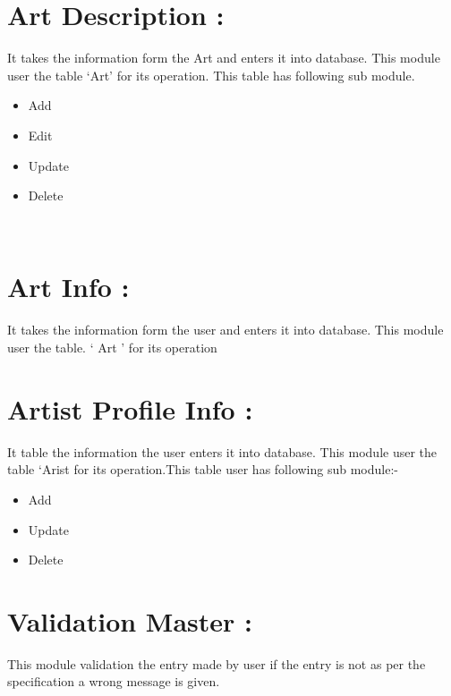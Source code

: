 \documentclass{article}
\begin{document}
\section*{Art Description : }
It takes the information form the Art and enters it into database. This module user the table ‘Art’ for its operation.
This table has following sub module.
\begin{itemize}
    \item Add
\item Edit
\item Update
\item Delete
\end{itemize}
\\
\section*{Art Info : }
It takes the information form the user and enters it into database. This module user the table. ‘ Art ’ for its operation
\section*{Artist Profile Info : }
It table the information the user enters it into database. This module user the table ‘Arist for its operation.This table user has following sub module:-
\begin{itemize}
    \item Add
\item Update
\item Delete
\end{itemize}
\section*{Validation Master : }
This module validation the entry made by user if the entry is not as per the specification a wrong message is given.
\end{document}
